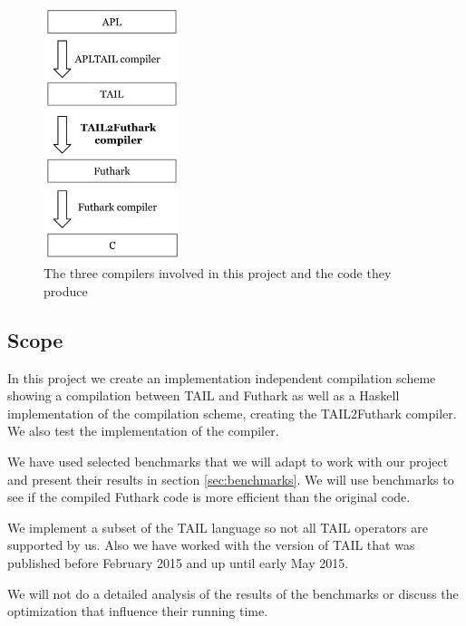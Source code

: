 \documentclass[11pt]{article}
\begin{document}
\begin{figure}
\begin{center}
    \includegraphics[width=4cm]{compilers.png}
    \caption{The three compilers involved in this project and the code they produce }
    \label{fig:compilers}
\end{center}
\end{figure}


\subsection{Scope}
In this project we create an implementation independent compilation scheme showing a compilation between TAIL and Futhark as well as a Haskell implementation of the compilation scheme, creating the TAIL2Futhark compiler. We also test the implementation of the compiler. 

We have used selected benchmarks that we will adapt to work with our project and present their results in section \ref{sec:benchmarks}. We will use benchmarks to see if the compiled Futhark code is more efficient than the original code. 

We implement a subset of the TAIL language so not all TAIL operators are supported by us. Also we have worked with  the version of TAIL that was published before February 2015 and up until early May 2015. 

We will not do a detailed analysis of the results of the benchmarks or discuss the optimization that influence their running time.
\end{document}
